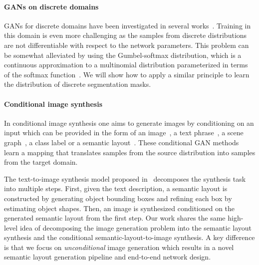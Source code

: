 \documentclass[10pt,twocolumn,letterpaper]{article}
\begin{document}
\paragraph{GANs on discrete domains} GANs for discrete domains have been investigated in several works~\cite{kusner2016gans,seqgan, rankgan, netgan, lu2018neural}. Training in this domain is even more challenging as the samples from discrete distributions are not differentiable with respect to the network parameters. This problem can be somewhat alleviated by using the Gumbel-softmax distribution, which is a continuous approximation to a multinomial distribution parameterized in terms of the softmax function~\cite{kusner2016gans}. We will show how to apply a similar principle to learn the distribution of discrete segmentation masks.

\vspace{-2mm}\paragraph{Conditional image synthesis} 
In conditional image synthesis one aims to generate images by conditioning on an input which can be provided in the form of an image~\cite{pix2pix, cyclegan, mcgan, compositionalGAN, liu2017unsupervised}, a text phrase~\cite{reed2016learning, stackgan, mirrorgan, ashual2019specifying, hong2018inferring}, a scene graph~\cite{johnson2018image, ashual2019specifying}, a class label or a semantic layout~\cite{odena2017conditional, chen2017photographic, pix2pixHD, SPADE}. These conditional GAN methods learn a mapping that translates samples from the source distribution into samples from the target domain. 

The text-to-image synthesis model proposed in~\cite{hong2018inferring} decomposes the synthesis task into multiple steps. First, given the text description, a semantic layout is constructed by generating object bounding boxes and refining each box by estimating object shapes. Then, an image is synthesized conditioned on the generated semantic layout from the first step. Our work shares the same high-level idea of decomposing the image generation problem into the semantic layout synthesis and the conditional semantic-layout-to-image synthesis. A key difference is that we focus on \textit{unconditional} image generation which results in a novel semantic layout generation pipeline and end-to-end network design.
\end{document}
